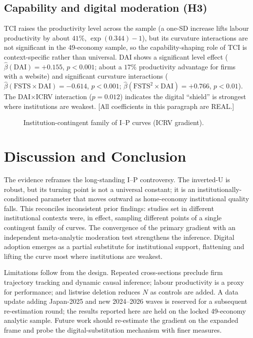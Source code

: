 \documentclass[12pt,a4paper]{article}
\begin{document}
\subsection{Capability and digital moderation (H3)}
TCI raises the productivity level across the sample (a one-SD increase lifts
labour productivity by about $41\%$, $\exp(0.344)-1$), but its
curvature interactions are not significant in the 49-economy sample, so the
capability-shaping role of TCI is context-specific rather than universal. DAI
shows a significant level effect ($\hat{\beta}(\mathrm{DAI}) = +0.155$,
$p < 0.001$; about a $17\%$ productivity advantage for firms with a website)
and significant curvature interactions
($\hat{\beta}(\mathrm{FSTS}\times\mathrm{DAI}) = -0.614$, $p<0.001$;
$\hat{\beta}(\mathrm{FSTS}^2\times\mathrm{DAI}) = +0.766$, $p<0.01$). The
DAI$\times$ICRV interaction ($p = 0.012$) indicates the digital ``shield'' is
strongest where institutions are weakest. [All coefficients in this
paragraph are REAL.]

\begin{figure}[H]
\centering
\caption{Institution-contingent family of I--P curves (ICRV gradient).}
\end{figure}

\section{Discussion and Conclusion}
The evidence reframes the long-standing I--P controversy. The inverted-U is
robust, but its turning point is not a universal constant; it is an
institutionally-conditioned parameter that moves outward as home-economy
institutional quality falls. This reconciles inconsistent prior findings:
studies set in different institutional contexts were, in effect, sampling
different points of a single contingent family of curves. The convergence of
the primary gradient with an independent meta-analytic moderation test
strengthens the inference. Digital adoption emerges as a partial substitute
for institutional support, flattening and lifting the curve most where
institutions are weakest.

Limitations follow from the design. Repeated cross-sections preclude firm
trajectory tracking and dynamic causal inference; labour productivity is a
proxy for performance; and listwise deletion reduces $N$ as controls are
added. A data update adding Japan-2025 and new 2024--2026 waves is reserved
for a subsequent re-estimation round; the results reported here are held on
the locked 49-economy analytic sample. Future work should re-estimate the
gradient on the expanded frame and probe the digital-substitution mechanism
with finer measures.


\end{document}
